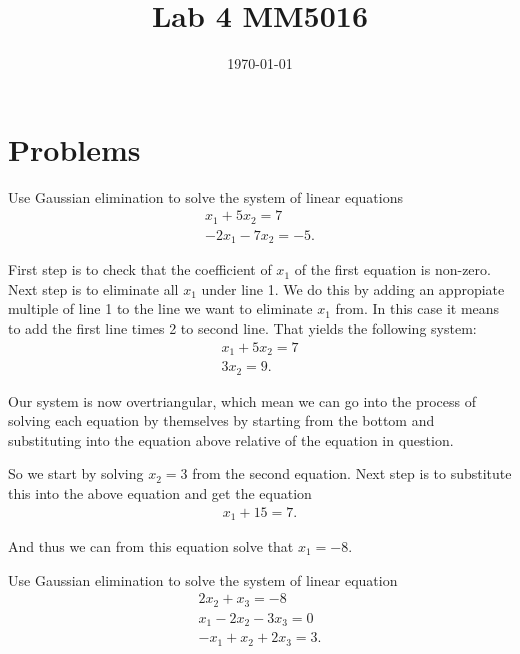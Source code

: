 \documentclass[10pt]{article}
\date{\today}
\title{Lab 4 MM5016}
\begin{document}
\maketitle


\section{Problems}
\label{sec:orgcbab2ba}

\begin{exercise}[System 1]  \label{exe:System_1}
Use Gaussian elimination to solve the system of linear equations
\begin{align*}
x_1 + 5x_2 = 7 \\
-2x_1 -7x_2 = -5
.
\end{align*}
\end{exercise}
\begin{solution}[]  \label{sol:}
First step is to check that the coefficient of \(x_1\) of the first
equation is non-zero.
Next step is to eliminate all \(x_1\) under line 1. We do this by
adding an appropiate multiple of line 1 to the line we
want to eliminate \(x_1\) from. In this case it means to add the first
line times 2 to second line. That yields the following system:
\begin{align*}
x_1 + 5x_2 = 7 \\
3x_2 = 9
.
\end{align*}

Our system is now overtriangular, which mean we can go into
the process of solving each equation by themselves by starting
from the bottom and substituting into the equation above
relative of the equation in question.


So we start by solving \(x_2 = 3\) from the second equation. Next step is
to substitute this into the above equation and get the equation
\begin{align*}
x_1 + 15 = 7
.
\end{align*}

And thus we can from this equation solve that \(x_1 = -8\).

\end{solution}
\begin{exercise}[System 2]  \label{exe:System_2}
Use Gaussian elimination to solve the system of linear equation
\begin{align*}
2x_2 + x_3 = -8 \\
x_1 - 2x_2 - 3x_3 = 0 \\
-x_1 + x_2 + 2x_3 = 3
.
\end{align*}
\end{exercise}
\end{document}
